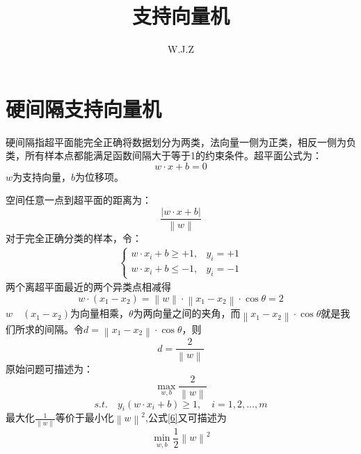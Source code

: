 \documentclass{article}
\title{支持向量机}
\author{W.J.Z}
\date{}
\begin{document}
	\maketitle
	\section{硬间隔支持向量机}
	硬间隔指超平面能完全正确将数据划分为两类，法向量一侧为正类，相反一侧为负类，所有样本点都能满足函数间隔大于等于1的约束条件。超平面公式为：
	\begin{equation}
		w\cdot x+ b = 0
	\end{equation}
	$w$为支持向量，$b$为位移项。
	
	空间任意一点到超平面的距离为：
	\begin{equation}
	\frac{\left | w\cdot x + b \right |}{\left \| w \right \|}
	\end{equation}
	对于完全正确分类的样本，令：
	\begin{align}
	\begin{cases}
	w\cdot x_{i} + b \geq +1,& y_{i}= +1 \\
	w\cdot x_{i} + b \leq -1,& y_{i}= -1 
	\end{cases}
	\end{align}                                                                                                    两个离超平面最近的两个异类点相减得
	\begin{equation}
	w\cdot \left ( x_{1}-x_{2} \right )=\left \| w \right \|\cdot \left \| x_{1}-x_{2} \right \|\cdot \cos \theta =2
	\end{equation}                                                                                                $w \quad (x_{1}-x_{2})$为向量相乘，$\theta$为两向量之间的夹角，而$\left \| x_{1}-x_{2} \right \|\cdot \cos \theta$就是我们所求的间隔。令$d=\left \| x_{1}-x_{2} \right \|\cdot \cos \theta$，则
	\begin{equation}
	d = \frac{2}{\left \| w \right \|}
	\end{equation}     
	原始问题可描述为：
	\begin{equation}
	\mathop{max}_{w,b}\frac{2}{\left \| w \right \|}
	\label{6}
	\end{equation}                       
	\begin{equation}
	s.t. \quad  y_{i}\left ( w\cdot x_{i}+b \right )\geq 1 , \quad i=1,2,\ldots,m
	\end{equation}   
	最大化$\frac{1}{\left \| w \right \|}$等价于最小化$\left \| w \right \|^{2}$,公式\ref{6}又可描述为
	\begin{equation}
	\mathop{min}_{w,b}\frac{1}{2}\left \| w \right \|^2
	\end{equation}                 
\end{document}
